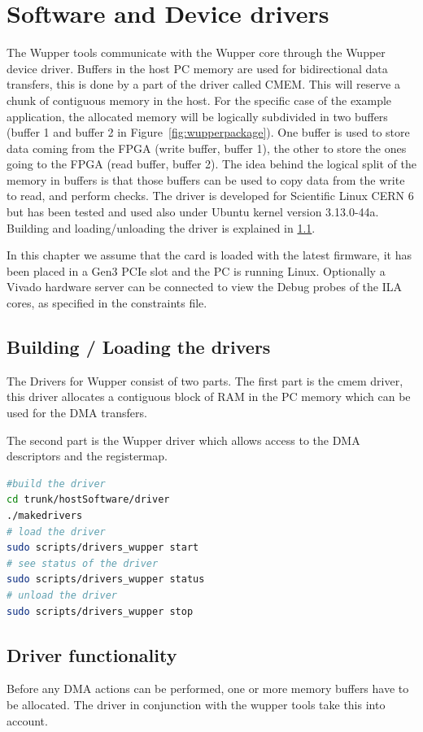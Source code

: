 \section{Software and Device drivers}
The Wupper tools communicate with the Wupper core through the Wupper device driver. Buffers in the host PC memory are used for bidirectional data transfers, this is done by a part of the driver called CMEM. This will reserve a chunk of contiguous memory in the host. For the specific case of the example application, the allocated memory will be logically subdivided in two buffers (buffer 1 and buffer 2 in Figure~\ref{fig:wupperpackage}). One buffer is used to store data coming from the FPGA (write buffer, buffer 1), the other to store the ones going to the FPGA (read buffer, buffer 2). The idea behind the logical split of the memory in buffers is that those buffers can be used to copy data from the write to read, and perform checks. The driver is developed for Scientific Linux CERN 6 but has been tested and used also under Ubuntu kernel version 3.13.0-44a. Building and loading/unloading the driver is explained in \ref{sec:buildloadDrivers}.

In this chapter we assume that the card is loaded with the latest firmware, it has been placed in a Gen3 PCIe slot and the PC is running Linux. Optionally a Vivado hardware server can be connected to view the Debug probes of the ILA cores, as specified in the constraints file. \cite{programming}\

\subsection{Building / Loading the drivers}
\label{sec:buildloadDrivers}
The Drivers for Wupper consist of two parts. The first part is the cmem driver, this driver allocates a contiguous block of RAM in the PC memory which can be used for the DMA transfers.

The second part is the Wupper driver which allows access to the DMA descriptors and the registermap.
\begin{lstlisting}[language=BASH, frame=single, caption=Building and Loading the driver]
#build the driver
cd trunk/hostSoftware/driver
./makedrivers
# load the driver
sudo scripts/drivers_wupper start
# see status of the driver
sudo scripts/drivers_wupper status
# unload the driver
sudo scripts/drivers_wupper stop
\end{lstlisting}
\subsection{Driver functionality}
Before any DMA actions can be performed, one or more memory buffers have to be allocated. The driver in conjunction with the wupper tools take this into account. 


